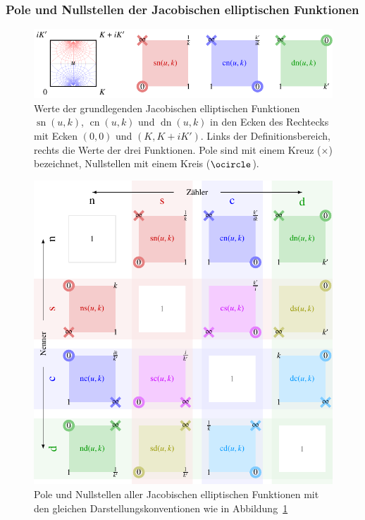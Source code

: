 \subsubsection{Pole und Nullstellen der Jacobischen elliptischen Funktionen}
\begin{figure}
\centering
\includegraphics{chapters/110-elliptisch/images/ellpolnul.pdf}
\caption{Werte der grundlegenden Jacobischen elliptischen Funktionen
$\operatorname{sn}(u,k)$,
$\operatorname{cn}(u,k)$
und
$\operatorname{dn}(u,k)$
in den Ecken des Rechtecks mit Ecken $(0,0)$ und $(K,K+iK')$.
Links der Definitionsbereich, rechts die Werte der drei Funktionen.
Pole sind mit einem Kreuz ($\times$) bezeichnet, Nullstellen mit einem
Kreis ($\ocircle$).
\label{buch:elliptisch:fig:ellpolnul}}
\end{figure}
\begin{figure}
\centering
\includegraphics{chapters/110-elliptisch/images/ellall.pdf}
\caption{Pole und Nullstellen aller Jacobischen elliptischen Funktionen
mit den gleichen Darstellungskonventionen wie in
Abbildung~\ref{buch:elliptisch:fig:ellpolnul}
\label{buch:elliptisch:fig:ellall}}
\end{figure}
